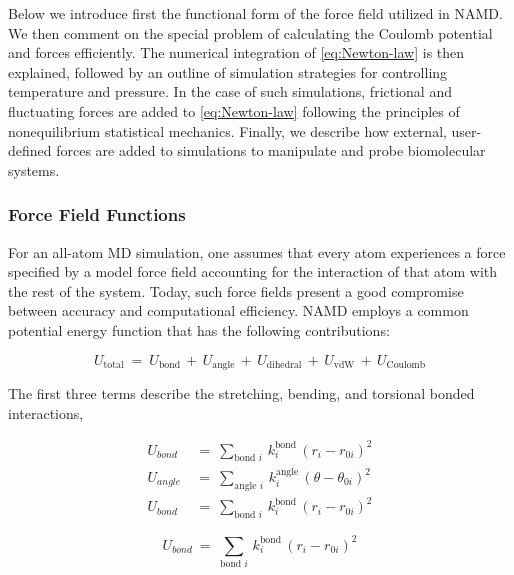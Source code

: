 Below we introduce first the functional form of the force field utilized in NAMD. We then comment on the special problem of calculating the Coulomb potential and forces efficiently. The numerical integration of \eqref{eq:Newton-law} is then explained, followed by an outline of simulation strategies for controlling temperature and pressure. In the case of such simulations, frictional and fluctuating forces are added to \eqref{eq:Newton-law} following the principles of nonequilibrium statistical mechanics. Finally, we describe how external, user-defined forces are added to simulations to manipulate and probe biomolecular systems.

\subsubsection{Force Field Functions}
For an all-atom MD simulation, one assumes that every atom experiences a force specified by a model force field accounting for the interaction of that atom with the rest of the system. Today, such force fields present a good compromise between accuracy and computational efficiency. NAMD employs a common potential energy function that has the following contributions:

\begin{equation}\label{eq:NAMD-PotEnergy}
U_{\text{total}} \: = \: U_{\text{bond}} \, + \, U_{\text{angle}} \, + \, U_{\text{dihedral}} \, + \, U_{\text{vdW}} \, + \, U_{\text{Coulomb}}
\end{equation}

The first three terms describe the stretching, bending, and torsional bonded interactions,

\begin{subequations}\label{grp}
\begin{align}
U_{bond} \: &= \: \sum_{\text{bond } i} \, k^{\text{bond}}_i \, \left( r_i - r_{0 i} \right)^2\label{second}\\
U_{angle} \: &= \: \sum_{\text{angle } i} \, k^{\text{angle}}_i \, \left( \theta - \theta_{0 i} \right)^2\label{third}\\
U_{bond} \: &= \: \sum_{\text{bond } i} \, k^{\text{bond}}_i \, \left( r_i - r_{0 i} \right)^2\label{fourth}
\end{align}
\end{subequations}

\begin{equation}
U_{bond} \: = \: \sum_{\text{bond } i} \, k^{\text{bond}}_i \, \left( r_i - r_{0 i} \right)^2
\end{equation}

